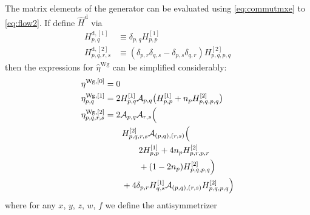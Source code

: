 \documentclass[amsmath, amssymb, aps, floatfix, nofootinbib, preprintnumbers,showpacs, superscriptaddress, twocolumn]{revtex4-1}
\begin{document}
The matrix elements of the generator can be evaluated using \eqref{eq:commutmxe} to \eqref{eq:flow2}.  If define $\hat{H}^{\text{d}}$ via
\begin{align*}
  H^{\text{d}, [1]}_{p, q} &\equiv \delta_{p, q} H^{[1]}_{p, p} \\
  H^{\text{d}, [2]}_{p, q, r, s} &\equiv (\delta_{p, r} \delta_{q, s} - \delta_{p, s} \delta_{q, r}) H^{[2]}_{p, q, p, q}
\end{align*}
then the expressions for $\hat{\eta}^{\text{Wg}}$ can be simplified considerably:
\begin{align*}
  \eta^{\text{Wg},[0]} &= 0 \\
  \eta^{\text{Wg},[1]}_{p, q} &= 2 H^{[1]}_{p, q} \mathcal{A}_{p, q} \bigl( H^{[1]}_{p, p} + n_p H^{[2]}_{p, q, p, q} \bigr) \\
  \eta^{\text{Wg},[2]}_{p, q, r, s} &= 2 \mathcal{A}_{p, q} \mathcal{A}_{r, s} \Big( \\
  &\qquad H^{[2]}_{p, q, r, s} \mathcal{A}_{(p, q), (r, s)} \Bigl(\\
  &\qquad \qquad 2 H^{[1]}_{p, p} + 4 n_p H^{[2]}_{p, r, p, r} \\
  &\qquad \qquad + (1 - 2 n_p) H^{[2]}_{p, q, p, q} \Bigr) \\
  &\qquad + 4 \delta_{p, r} H^{[1]}_{q, s} \mathcal{A}_{(p, q), (r, s)} H^{[2]}_{p, q, p, q}
  \Bigr)
\end{align*}
where for any $x$, $y$, $z$, $w$, $f$ we define the antisymmetrizer
\end{document}

